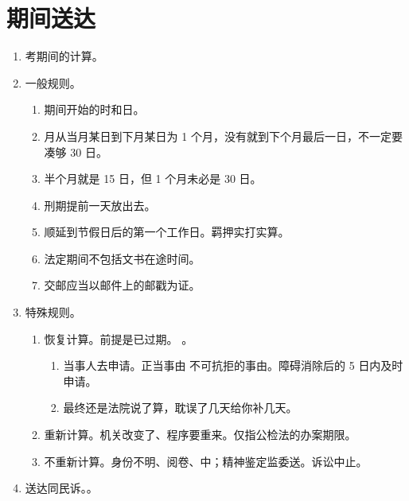 \section{期间送达}
\begin{enumerate}
  \item 考期间的计算。
  \item 一般规则。
        \begin{enumerate}
          \item 期间开始的时和日。
          \item 月从当月某日到下月某日为 1 个月，没有就到下个月最后一日，不一定要凑够 30 日。
          \item 半个月就是 15 日，但 1 个月未必是 30 日。
          \item 刑期提前一天放出去。
          \item 顺延到节假日后的第一个工作日。羁押实打实算。
          \item 法定期间不包括文书在途时间。
          \item 交邮应当以邮件上的邮戳为证。
        \end{enumerate}
  \item 特殊规则。
        \begin{enumerate}
          \item 恢复计算。前提是已过期。
                。
                \begin{enumerate}
                  \item 当事人去申请。\yi 正当事由 \hz 不可抗拒的事由。\er 障碍消除后的 5 日内及时申请。
                  \item 最终还是法院说了算，耽误了几天给你补几天。
                \end{enumerate}
          \item 重新计算。机关改变了、程序要重来。仅指公检法的办案期限。
          \item 不重新计算。身份不明、阅卷、中；精神鉴定监委送。诉讼中止。
        \end{enumerate}
  \item 送达同民诉。。
\end{enumerate}
